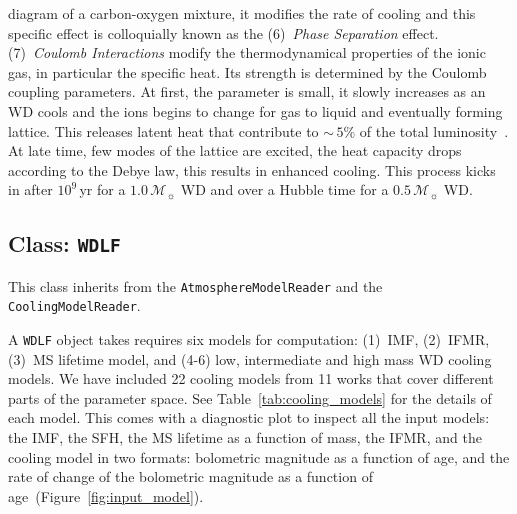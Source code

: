 \documentclass[fleqn,usenatbib]{rasti}
\newcommand{\msun}{\mathcal{M}_{\sun}}
\begin{document}
diagram of a carbon-oxygen mixture, it modifies the rate of cooling and this
specific effect is colloquially known as the (6)~\textit{Phase Separation}
effect. (7)~\textit{Coulomb Interactions} modify the thermodynamical
properties of the ionic gas, in particular the specific heat. Its strength is
determined by the Coulomb coupling parameters. At first, the parameter is
small, it slowly increases as an WD cools and the ions begins to change for
gas to liquid and eventually forming lattice. This releases latent heat that
contribute to $\sim$\,$5\%$ of the total luminosity~\citep{1976A&A....51..383S}.
At late time, few modes of the lattice are excited, the heat capacity drops
according to the Debye law, this results in enhanced cooling. This process
kicks in after $10^9$\,yr for a $1.0\,\msun$ WD and over a Hubble time for a
$0.5\,\msun$ WD.

\subsection{Class: \texttt{WDLF}}
This class inherits from the \verb+AtmosphereModelReader+ and the
\verb+CoolingModelReader+.

A \texttt{WDLF} object takes requires six models for computation: (1)~IMF,
(2)~IFMR, (3)~MS lifetime model, and (4-6) low, intermediate and high mass WD
cooling models. We have included 22 cooling models from 11 works that cover
different parts of the parameter space. See Table~\ref{tab:cooling_models} for
the details of each model. This comes with a diagnostic plot to inspect all
the input models: the IMF, the SFH, the MS lifetime as a function of mass,
the IFMR, and the cooling model in two formats: bolometric magnitude as a
function of age, and the rate of change of the bolometric magnitude as a
function of age~(Figure~\ref{fig:input_model}).
\end{document}
